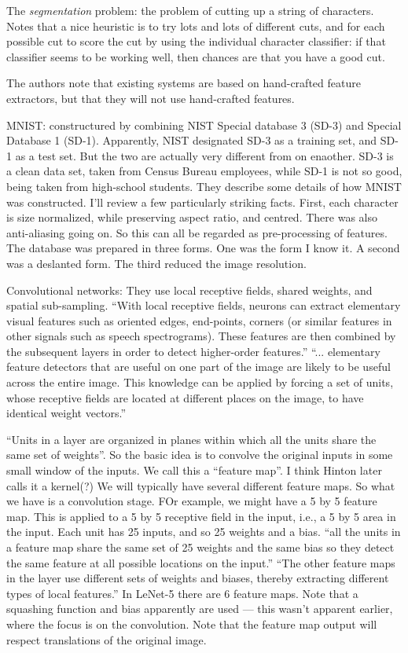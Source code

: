 \documentclass[12pt]{article}
\begin{document}
The \emph{segmentation} problem: the problem of cutting up a string of
characters.  Notes that a nice heuristic is to try lots and lots of
different cuts, and for each possible cut to score the cut by using
the individual character classifier: if that classifier seems to be
working well, then chances are that you have a good cut.

The authors note that existing systems are based on hand-crafted
feature extractors, but that they will not use hand-crafted features.

MNIST: constructured by combining NIST Special database 3 (SD-3) and
Special Database 1 (SD-1).  Apparently, NIST designated SD-3 as a
training set, and SD-1 as a test set.  But the two are actually very
different from on enaother.  SD-3 is a clean data set, taken from
Census Bureau employees, while SD-1 is not so good, being taken from
high-school students.  They describe some details of how MNIST was
constructed.  I'll review a few particularly striking facts.  First,
each character is size normalized, while preserving aspect ratio, and
centred.  There was also anti-aliasing going on.  So this can all be
regarded as pre-processing of features.  The database was prepared in
three forms.  One was the form I know it.  A second was a deslanted
form.  The third reduced the image resolution.

Convolutional networks: They use local receptive fields, shared
weights, and spatial sub-sampling.  ``With local receptive fields,
neurons can extract elementary visual features such as oriented edges,
end-points, corners (or similar features in other signals such as
speech spectrograms).  These features are then combined by the
subsequent layers in order to detect higher-order features.''
``... elementary feature detectors that are useful on one part of the
image are likely to be useful across the entire image.  This knowledge
can be applied by forcing a set of units, whose receptive fields are
located at different places on the image, to have identical weight
vectors.''

``Units in a layer are organized in planes within which all the units
share the same set of weights''.  So the basic idea is to convolve the
original inputs in some small window of the inputs.  We call this a
``feature map''.  I think Hinton later calls it a kernel(?)  We will
typically have several different feature maps.  So what we have is a
convolution stage.  FOr example, we might have a 5 by 5 feature map.
This is applied to a 5 by 5 receptive field in the input, i.e., a 5 by
5 area in the input.  Each unit has 25 inputs, and so 25 weights and a
bias.  ``all the units in a feature map share the same set of 25
weights and the same bias so they detect the same feature at all
possible locations on the input.''  ``The other feature maps in the
layer use different sets of weights and biases, thereby extracting
different types of local features.''  In LeNet-5 there are 6 feature
maps.  Note that a squashing function and bias apparently are used ---
this wasn't apparent earlier, where the focus is on the convolution.
Note that the feature map output will respect translations of the
original image.
\end{document}
